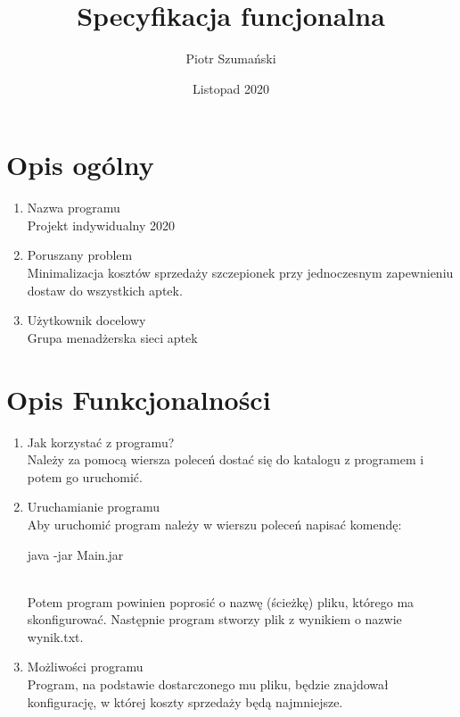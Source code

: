 \documentclass{article}
\title{Specyfikacja funcjonalna}
\author{Piotr Szumański}
\date{Listopad 2020}
\begin{document}
\maketitle

\section{Opis ogólny}
\begin{enumerate}
    \item Nazwa programu
    \\ Projekt indywidualny 2020
    \item Poruszany problem
    \\ Minimalizacja kosztów sprzedaży szczepionek przy jednoczesnym zapewnieniu dostaw do wszystkich aptek.
    \item Użytkownik docelowy
    \\ Grupa menadżerska sieci aptek
\end{enumerate}

\section{Opis Funkcjonalności}
\begin{enumerate}
    \item Jak korzystać z programu?
    \\Należy za pomocą wiersza poleceń dostać się do katalogu z programem i potem go uruchomić. 
    \item Uruchamianie programu
    \\Aby uruchomić program należy w wierszu poleceń napisać komendę:
    \begin{tcolorbox}
    java -jar Main.jar
    \end{tcolorbox}
    \\Potem program powinien poprosić o nazwę (ścieżkę) pliku, którego ma skonfigurować. Następnie program stworzy plik z wynikiem o nazwie wynik.txt.
    \item Możliwości programu
    \\Program, na podstawie dostarczonego mu pliku, będzie znajdował konfigurację, w której koszty sprzedaży będą najmniejsze.
\end{enumerate}
\end{document}
